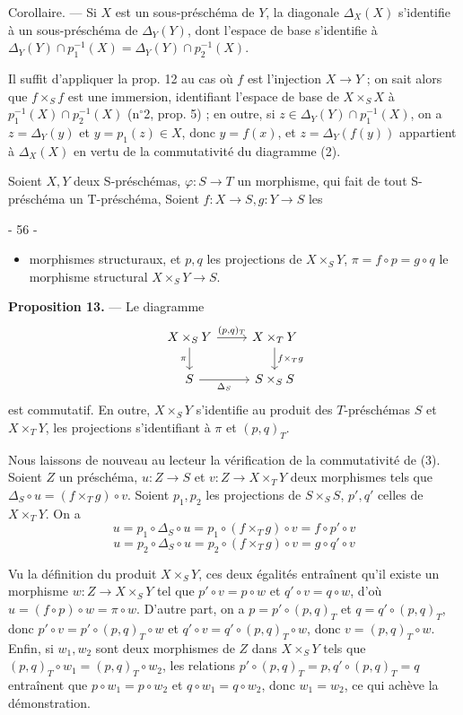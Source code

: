 Corollaire. — Si $X$ est un sous-préschéma de $Y$, la diagonale $\Delta_X(X)$ s'identifie à un sous-préschéma de $\Delta_Y(Y)$, dont l'espace de base s'identifie à $\Delta_Y(Y) \cap p_1^{-1}(X) = \Delta_Y(Y) \cap p_2^{-1}(X)$.

Il suffit d'appliquer la prop. 12 au cas où $f$ est l'injection $X \to Y$ ; on sait alors que $f \times_S f$ est une immersion, identifiant l'espace de base de $X \times_S X$ à $p_1^{-1}(X) \cap p_2^{-1}(X)$ (n$^\circ$2, prop. 5) ; en outre, si $z \in \Delta_Y(Y) \cap p_1^{-1}(X)$, on a $z = \Delta_Y(y)$ et $y = p_1(z) \in X$, donc $y = f(x)$, et $z = \Delta_Y(f(y))$ appartient à $\Delta_X(X)$ en vertu de la commutativité du diagramme (2).

Soient $X, Y$ deux S-préschémas, $\varphi : S \to T$ un morphisme, qui fait de tout S-préschéma un T-préschéma, Soient $f : X \to S, g : Y \to S$ les

\newpage


- 56 -

\begin{itemize}
    \item morphismes structuraux, et $p, q$ les projections de $X \times_S Y$, $\pi = f \circ p = g \circ q$ le morphisme structural $X \times_S Y \to S$.
\end{itemize}

\textbf{Proposition 13.} — Le diagramme
$$
\begin{tikzcd}
X \times_S Y \arrow[r, "{(p, q)_T}"] \arrow[d, "\pi"'] & X \times_T Y \arrow[d, "f \times_T g"] \\
S \arrow[r, "\Delta_S"'] & S \times_S S
\end{tikzcd}
$$
est commutatif. En outre, $X \times_S Y$ s'identifie au produit des $T$-préschémas $S$ et $X \times_T Y$, les projections s'identifiant à $\pi$ et $(p, q)_T$.

Nous laissons de nouveau au lecteur la vérification de la commutativité de (3). Soient $Z$ un préschéma, $u: Z \to S$ et $v: Z \to X \times_T Y$ deux morphismes tels que $\Delta_S \circ u = (f \times_T g) \circ v$. Soient $p_1, p_2$ les projections de $S \times_S S$, $p', q'$ celles de $X \times_T Y$. On a
$$ u = p_1 \circ \Delta_S \circ u = p_1 \circ (f \times_T g) \circ v = f \circ p' \circ v $$
$$ u = p_2 \circ \Delta_S \circ u = p_2 \circ (f \times_T g) \circ v = g \circ q' \circ v $$

Vu la définition du produit $X \times_S Y$, ces deux égalités entraînent qu'il existe un morphisme $w: Z \to X \times_S Y$ tel que $p' \circ v = p \circ w$ et $q' \circ v = q \circ w$, d'où $u = (f \circ p) \circ w = \pi \circ w$. D'autre part, on a $p = p' \circ (p, q)_T$ et $q = q' \circ (p, q)_T$, donc $p' \circ v = p' \circ (p, q)_T \circ w$ et $q' \circ v = q' \circ (p, q)_T \circ w$, donc $v = (p, q)_T \circ w$. Enfin, si $w_1, w_2$ sont deux morphismes de $Z$ dans $X \times_S Y$ tels que $(p, q)_T \circ w_1 = (p, q)_T \circ w_2$, les relations $p' \circ (p, q)_T = p, q' \circ (p, q)_T = q$ entraînent que $p \circ w_1 = p \circ w_2$ et $q \circ w_1 = q \circ w_2$, donc $w_1 = w_2$, ce qui achève la démonstration.

